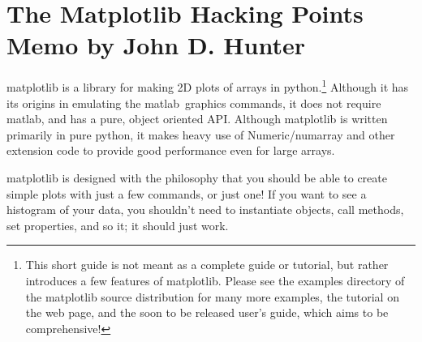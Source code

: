 \documentclass[twoside,10pt]{book}
\begin{document}


\newcommand{\fig}[4]
{\begin{figure}[ht]
\begin{center}
\texttt{[image: \#2]}
\caption{\label{#4} #3}
\end{center}
\end{figure}}

\newcommand{\mytextsize}[0]{\footnotesize}
\newcommand{\myheadersize}[0]{\small}
\newcommand{\matlab}[0]{matlab{\texttrademark}}
\newcommand{\fname}[1]{{\tt #1}}
\newcommand{\func}[1]{{\tt #1}}
\newcommand{\code}[1]{{\tt #1}}
\newcommand{\prompt}[1]{\code{>>> #1}}
\newcommand{\carg}[1]{\textit{#1}} %
\newcommand{\val}[1]{\textit{#1}}
\newcommand{\rc}[1]{{\tt #1}}

\newcommand{\mpldoc}[1]{#1}

\mytextsize
\section*{\large The Matplotlib Hacking Points Memo \normalsize by John D. Hunter}

matplotlib is a library for making 2D plots of arrays in
python.\footnote{This short guide is not meant as a complete guide or
  tutorial, but rather introduces a few features of matplotlib.
  Please see the examples directory of the matplotlib source
  distribution for many more examples, the tutorial on the web page,
  and the soon to be released user's guide, which aims to be
  comprehensive!  } Although it has its origins in emulating the
\matlab\ graphics commands, it does not require matlab, and has a
pure, object oriented API.  Although matplotlib is written primarily
in pure python, it makes heavy use of Numeric/numarray and other
extension code to provide good performance even for large arrays.

matplotlib is designed with the philosophy that you should be able to
create simple plots with just a few commands, or just one!  If you
want to see a histogram of your data, you shouldn't need to
instantiate objects, call methods, set properties, and so it; it
should just work.  
\end{document}
